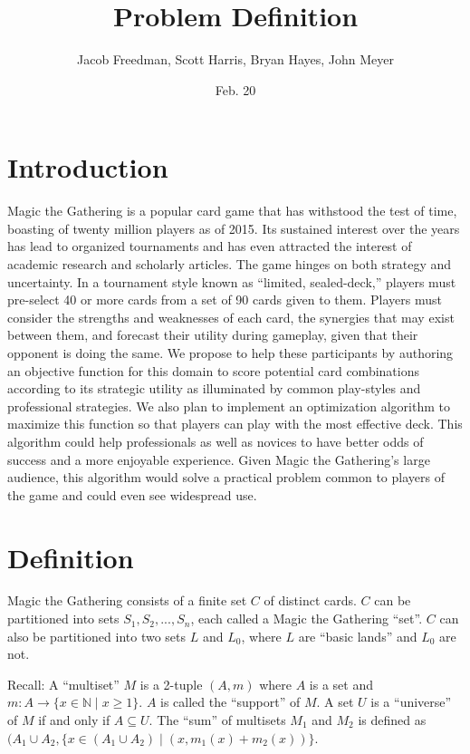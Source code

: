 \documentclass[12pt, letterpaper]{article}
\title{Problem Definition}
\date{Feb. 20}
\author{Jacob Freedman, Scott Harris, Bryan Hayes, John Meyer}
\begin{document}
\maketitle

\section{Introduction}

Magic the Gathering is a popular card game that has withstood the test of time,
boasting of twenty million players as of 2015.
Its sustained interest over the years has lead to organized tournaments
and has even attracted the interest of academic research and scholarly articles.
The game hinges on both strategy and uncertainty.
In a tournament style known as \enquote{limited, sealed-deck,}
players must pre-select 40 or more cards from a set of 90 cards given to them.
Players must consider the strengths and weaknesses of each card,
the synergies that may exist between them,
and forecast their utility during gameplay,
given that their opponent is doing the same.
We propose to help these participants by authoring an objective function for this
domain to score potential card combinations according to its strategic utility
as illuminated by common play-styles and professional strategies.
We also plan to implement an optimization algorithm to maximize this function
so that players can play with the most effective deck.
This algorithm could help professionals as well as novices to have better odds of success
and a more enjoyable experience.
Given Magic the Gathering’s large audience,
this algorithm would solve a practical problem common to players of the game
and could even see widespread use.

\section{Definition}

Magic the Gathering consists of a finite set $ C $ of distinct cards.
$ C $ can be partitioned into sets $ S_1, S_2, ..., S_n $, each called a Magic the Gathering \enquote{set}.
$ C $ can also be partitioned into two sets $ L $ and $ L_0 $, where $ L $ are \enquote{basic lands} and $ L_0 $ are not.

Recall: A \enquote{multiset} $ M $ is a 2-tuple $ (A, m) $
where $ A $ is a set and $ m: A \rightarrow \{x \in \mathbb{N} \mid x \ge 1 \} $.
$ A $ is called the \enquote{support} of $ M $.
A set $ U $ is a \enquote{universe} of $ M $ if and only if $ A \subseteq U $.
The \enquote{sum} of multisets $ M_1 $ and $ M_2 $ is defined as
$ (A_1 \cup A_2, \{ x \in (A_1 \cup A_2) \mid (x, m_1(x) + m_2(x)) \} $.
\end{document}
